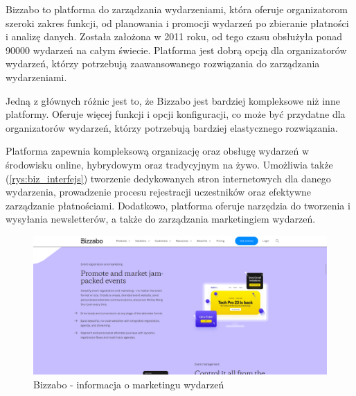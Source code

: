 Bizzabo to platforma do zarządzania wydarzeniami, która oferuje organizatorom szeroki zakres funkcji, od planowania i promocji wydarzeń po zbieranie płatności i analizę danych. Została założona w 2011 roku, od tego czasu obsłużyła ponad 90000 wydarzeń na całym świecie. Platforma jest dobrą opcją dla organizatorów wydarzeń, którzy potrzebują zaawansowanego rozwiązania do zarządzania wydarzeniami.\autocite{bizzabo}

Jedną z głównych różnic jest to, że Bizzabo jest bardziej kompleksowe niż inne platformy. Oferuje więcej funkcji i opcji konfiguracji, co może być przydatne dla organizatorów wydarzeń, którzy potrzebują bardziej elastycznego rozwiązania. 

Platforma zapewnia kompleksową organizację oraz obsługę wydarzeń w środowisku online, hybrydowym oraz tradycyjnym na żywo. Umożliwia także (\autoref{rys:biz_interfejs}) tworzenie dedykowanych stron internetowych dla danego wydarzenia, prowadzenie procesu rejestracji uczestników oraz efektywne zarządzanie płatnościami. Dodatkowo, platforma oferuje narzędzia do tworzenia i wysyłania newsletterów, a także do zarządzania marketingiem wydarzeń.

\begin{figure} [h]
    \begin{center}
    \includegraphics[scale=0.35]{imgs/solutions/bizabo.png}
    \end{center}
    \caption{Bizzabo - informacja o marketingu wydarzeń}
    \label{rys:biz_interfejs}
    \end{figure}